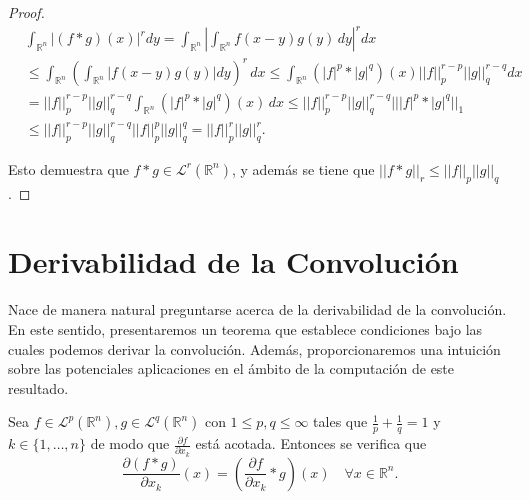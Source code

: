 \begin{proof}
\begin{equation}\label{eq:holder}
\begin{aligned}
    &\int_{\mathbb{R}^n}|(f*g)(x)|^r dy 
    = \int_{\mathbb{R}^n}\left| \int_{\mathbb{R}^n} f(x-y)g(y) \, dy \right|^r dx \\
    &\leq  \int_{\mathbb{R}^n}\left(\int_{\mathbb{R}^n}|f(x-y)g(y)| dy\right)^r \, dx \leq \int_{\mathbb{R}^n}(|f|^p*|g|^q)(x)||f||_{p}^{r-p}||g||_{q}^{r-q}dx\\ 
    &= ||f||_{p}^{r-p}||g||_{q}^{r-q}  \int_{\mathbb{R}^n}(|f|^p*|g|^q)(x)\, dx \leq ||f||_{p}^{r-p}||g||_{q}^{r-q}  |||f|^p*|g|^q||_1 \\
    &\leq ||f||_{p}^{r-p}||g||_{q}^{r-q}||f||_{p}^{p}||g||_{q}^{q} = ||f||_{p}^{r}||g||_{q}^{r}.
\end{aligned}
\end{equation}


\noindent Esto demuestra que $f*g \in \mathscr{L}^r(\mathbb{R}^n)$, y además se tiene que $||f*g||_r \leq ||f||_p||g||_q$.

\end{proof}




\section{Derivabilidad de la Convolución}

Nace de manera natural preguntarse acerca de la derivabilidad de la convolución. En este sentido, presentaremos un teorema que establece condiciones bajo las cuales podemos derivar la convolución. Además, proporcionaremos una intuición sobre las potenciales aplicaciones en el ámbito de la computación de este resultado.

\begin{teorema}\label{teo:dericonv}
Sea $f \in \mathscr{L}^p(\mathbb{R}^n), g \in \mathscr{L}^q(\mathbb{R}^n)$  con  $1\leq p, q \leq \infty$ tales que $\frac{1}{p}+\frac{1}{q}=1$ y $k \in \{1,\ldots,n\}$ de modo que $\frac{\partial f}{\partial x_k}$ está acotada. Entonces 
se verifica que 
    \begin{equation} \label{eq:derivada}
    \frac{\partial(f*g)}{\partial x_k}(x) = \left(\frac{\partial f}{\partial x_k}*g \right)(x) \quad \forall x \in \mathbb{R}^ n.
\end{equation}
\end{teorema}

